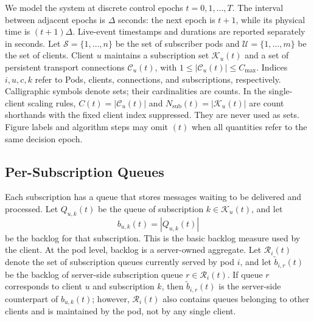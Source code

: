 \documentclass[manuscript]{acmart}
\begin{document}
We model the system at discrete control epochs $t=0,1,\ldots,T$. The interval
between adjacent epochs is $\Delta$ seconds: the next epoch is $t+1$, while
its physical time is $(t+1)\Delta$. Live-event timestamps and durations are
reported separately in seconds. Let
$\mathcal{S}=\{1,\ldots,n\}$ be the set of subscriber pods and
$\mathcal{U}=\{1,\ldots,m\}$ be the set of clients. Client $u$ maintains a
subscription set $\mathcal{K}_u(t)$ and a set of persistent transport
connections $\mathcal{C}_u(t)$, with
$1\leq |\mathcal{C}_u(t)|\leq C_{\max}$.
Indices $i,u,c,k$ refer to Pods, clients, connections, and subscriptions,
respectively. Calligraphic symbols denote sets; their cardinalities are
counts. In the single-client scaling rules, $C(t)=|\mathcal{C}_u(t)|$ and
$N_{\mathrm{sub}}(t)=|\mathcal{K}_u(t)|$ are count shorthands with the fixed client
index suppressed. They are never used as sets. Figure labels and algorithm
steps may omit $(t)$ when all quantities refer to the same decision epoch.

\subsection{Per-Subscription Queues}

Each subscription has a queue that stores messages waiting to be delivered and
processed. Let $Q_{u,k}(t)$ be the queue of subscription
$k\in\mathcal{K}_u(t)$, and let
\begin{equation}
	b_{u,k}(t)=|Q_{u,k}(t)|
\end{equation}
be the backlog for that subscription. This is the basic backlog measure used
by the client. At the pod level, backlog is a
server-owned aggregate. Let $\mathcal{R}_i(t)$ denote the set of subscription
queues currently served by pod $i$, and let $\tilde{b}_{i,r}(t)$ be the backlog
of server-side subscription queue $r\in\mathcal{R}_i(t)$. If queue $r$
corresponds to client $u$ and subscription $k$, then $\tilde{b}_{i,r}(t)$ is
the server-side counterpart of $b_{u,k}(t)$; however, $\mathcal{R}_i(t)$ also
contains queues belonging to other clients and is maintained by the pod, not by
any single client.
\end{document}
